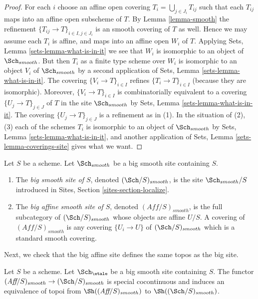 \begin{proof}
For each $i$ choose an affine open covering $T_i = \bigcup_{j \in J_i} T_{ij}$
such that each $T_{ij}$ maps into an affine open subscheme of $T$. By
Lemma \ref{lemma-smooth}
the refinement $\{T_{ij} \to T\}_{i \in I, j \in J_i}$ is an smooth covering
of $T$ as well. Hence we may assume each $T_i$ is affine, and maps into
an affine open $W_i$ of $T$. Applying
Sets, Lemma \ref{sets-lemma-what-is-in-it}
we see that $W_i$ is isomorphic to an object of $\Sch_{smooth}$.
But then $T_i$ as a finite type scheme over $W_i$
is isomorphic to an object $V_i$ of $\Sch_{smooth}$ by a second
application of
Sets, Lemma \ref{sets-lemma-what-is-in-it}.
The covering $\{V_i \to T\}_{i \in I}$ refines $\{T_i \to T\}_{i \in I}$
(because they are isomorphic).
Moreover, $\{V_i \to T\}_{i \in I}$ is combinatorially equivalent to a
covering $\{U_j \to T\}_{j \in J}$ of $T$ in the site
$\Sch_{smooth}$ by
Sets, Lemma \ref{sets-lemma-what-is-in-it}.
The covering $\{U_j \to T\}_{j \in J}$ is a refinement as in (1).
In the situation of (2), (3) each of the
schemes $T_i$ is isomorphic to an object of $\Sch_{smooth}$ by
Sets, Lemma \ref{sets-lemma-what-is-in-it},
and another application of
Sets, Lemma \ref{sets-lemma-coverings-site}
gives what we want.
\end{proof}

\begin{definition}
\label{definition-big-small-smooth}
Let $S$ be a scheme. Let $\Sch_{smooth}$ be a big smooth
site containing $S$.
\begin{enumerate}
\item The {\it big smooth site of $S$}, denoted
$(\Sch/S)_{smooth}$, is the site $\Sch_{smooth}/S$
introduced in Sites, Section \ref{sites-section-localize}.
\item The {\it big affine smooth site of $S$}, denoted
$(\textit{Aff}/S)_{smooth}$, is the full subcategory of
$(\Sch/S)_{smooth}$ whose objects are affine $U/S$.
A covering of $(\textit{Aff}/S)_{smooth}$ is any covering
$\{U_i \to U\}$ of $(\Sch/S)_{smooth}$ which is a
standard smooth covering.
\end{enumerate}
\end{definition}

\noindent
Next, we check that the big affine site defines the same
topos as the big site.

\begin{lemma}
\label{lemma-affine-big-site-smooth}
Let $S$ be a scheme. Let $\Sch_\etale$ be a big smooth
site containing $S$.
The functor
$(\textit{Aff}/S)_{smooth} \to (\Sch/S)_{smooth}$
is special cocontinuous and induces an equivalence of topoi from
$\Sh((\textit{Aff}/S)_{smooth})$ to
$\Sh((\Sch/S)_{smooth})$.
\end{lemma}

